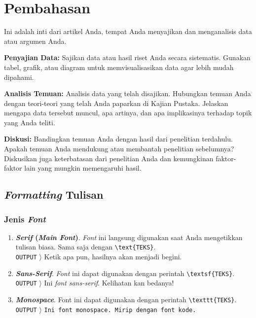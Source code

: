 \section{Pembahasan}


Ini adalah inti dari artikel Anda, tempat Anda menyajikan dan menganalisis data atau argumen Anda.

\textbf{Penyajian Data:} Sajikan data atau hasil riset Anda secara sistematis. Gunakan tabel, grafik, atau diagram untuk memvisualisasikan data agar lebih mudah dipahami.

\textbf{Analisis Temuan:} Analisis data yang telah disajikan. Hubungkan temuan Anda dengan teori-teori yang telah Anda paparkan di Kajian Pustaka. Jelaskan mengapa data tersebut muncul, apa artinya, dan apa implikasinya terhadap topik yang Anda teliti.

\textbf{Diskusi:} Bandingkan temuan Anda dengan hasil dari penelitian terdahulu. Apakah temuan Anda mendukung atau membantah penelitian sebelumnya? Diskusikan juga keterbatasan dari penelitian Anda dan kemungkinan faktor-faktor lain yang mungkin memengaruhi hasil.

\subsection{\textit{Formatting} Tulisan}

\subsubsection{Jenis \textit{Font}}

\begin{enumerate}[label=\alph*.]
    \item \textbf{\textit{Serif} (\textit{Main Font})}. \textit{Font} ini langsung digunakan saat Anda mengetikkan tulisan biasa. Sama saja dengan \verb|\text{TEKS}|. \\
    \texttt{OUTPUT} $\rangle$ Ketik apa pun, hasilnya akan menjadi begini.
    \item \textbf{\textit{Sans-Serif}}. \textit{Font} ini dapat digunakan dengan perintah \verb|\textsf{TEKS}|. \\
    \texttt{OUTPUT} $\rangle$ \textsf{Ini \textit{font sans-serif}. Kelihatan kan bedanya!}
    \item \textbf{\textit{Monospace}}. Font ini dapat digunakan dengan perintah \verb|\texttt{TEKS}|. \\
    \texttt{OUTPUT} $\rangle$ \texttt{Ini font monospace. Mirip dengan font kode.}
\end{enumerate}

